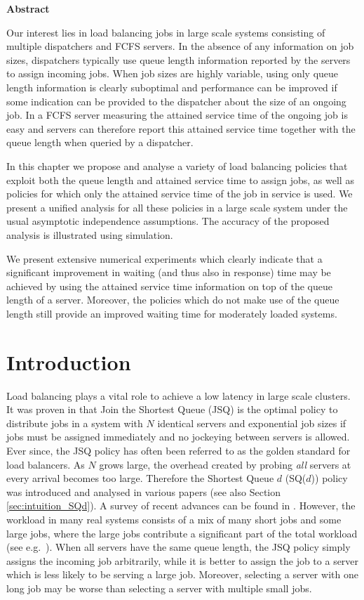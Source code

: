 \documentclass[12pt]{report}
\newenvironment{chapabstract}{%
    \begin{center}%
      \bfseries Abstract
    \end{center}}%
   {\par}
\begin{document}
\begin{chapabstract}
Our interest lies in load balancing jobs in large scale systems consisting of multiple dispatchers and FCFS servers. In the absence of any information on job sizes, dispatchers 
typically use queue length information reported by the servers to assign incoming jobs.
When job sizes are highly variable, using only queue length information is clearly suboptimal and performance can be improved if some indication can be provided to the dispatcher
about the size of an ongoing job. In a FCFS server measuring the attained service time of the ongoing job is easy and servers can therefore report this attained service time together with
the  queue length when queried by a dispatcher.

In this chapter we propose and analyse a variety of load balancing policies that exploit
both the queue length and attained service time to assign jobs, as well as policies 
for which only the attained service time of the job in service is used.
We present a unified analysis for all these policies in a large scale system under the usual
asymptotic independence assumptions.  The accuracy of the proposed analysis is illustrated using simulation.

We present extensive numerical experiments which clearly indicate that a significant improvement in waiting (and thus also in response) time may be achieved by using the attained service time information on top of the queue length of a server. Moreover, the policies which do not make use of the queue length still provide an improved waiting time for moderately loaded systems.
\end{chapabstract}

\section{Introduction}

Load balancing plays a vital role to achieve a low latency in large scale clusters. It was proven in \cite{winston77} that Join the Shortest Queue (JSQ) is the optimal policy to distribute jobs in a system with $N$ identical servers and exponential job sizes if jobs must be assigned immediately and
no jockeying between servers is allowed. Ever since, the JSQ policy has often been referred to as the golden standard for load balancers. As $N$ grows large, the overhead created by probing \textit{all} servers at every arrival becomes too large. Therefore the Shortest Queue $d$ (SQ($d$)) policy was introduced and analysed in various papers \cite{mitzenmacher2001power, aghajani2017pde, vasantam2018mean, vvedenskaya3} (see also Section \ref{sec:intuition_SQd}). A survey of recent advances can be found in \cite{van2018scalable}. However, the workload in many real systems consists of a mix of many short jobs
and some large jobs, where the large jobs contribute a significant part of the total workload (see e.g.~\cite{Sparrow,delgado2016job, delgado2015hawk}). When all servers have the same queue length, the JSQ policy simply assigns the incoming job arbitrarily, while it is better to assign the job to a server which is less likely to be serving a large job. Moreover, selecting a server with one long job may be worse than selecting a server with multiple small jobs. 
\end{document}
